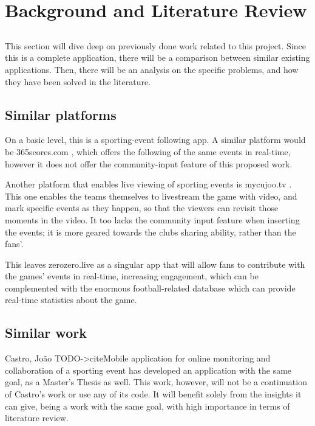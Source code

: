 \chapter{Background and Literature Review} \label{chap:sota}

\section*{}

This section will dive deep on previously done work related to this project. Since this is a complete application, there will be a comparison between similar existing applications. Then, there will be an analysis on the specific problems, and how they have been solved in the literature.

\section{Similar platforms}

On a basic level, this is a sporting-event following app. A similar platform would be 365scores.com \cite{kn:365scores-about}, which offers the following of the same events in real-time, however it does not offer the community-input feature of this proposed work.

Another platform that enables live viewing of sporting events is mycujoo.tv \cite{kn:mycujoo-about}. This one enables the teams themselves to livestream the game with video, and mark specific events as they happen, so that the viewers can revisit those moments in the video. It too lacks the community input feature when inserting the events; it is more geared towards the clubs sharing ability, rather than the fans'. 

This leaves zerozero.live as a singular app that will allow fans to contribute with the games' events in real-time, increasing engagement, which can be complemented with the enormous football-related database which can provide real-time statistics about the game.

\section{Similar work}

Castro, João TODO->cite{Mobile application for online monitoring and collaboration of a sporting event} has developed an application with the same goal, as a Master's Thesis as well. This work, however, will not be a continuation of Castro's work or use any of its code. It will benefit solely from the insights it can give, being a work with the same goal, with high importance in terms of literature review.

